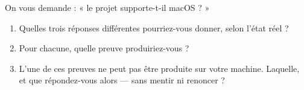 \begin{nklogique}
On vous demande : « le projet supporte-t-il macOS ? »

\begin{enumerate}
\item Quelles trois réponses différentes pourriez-vous donner, selon l'état réel ?
\item Pour chacune, quelle preuve produiriez-vous ?
\item L'une de ces preuves ne peut pas être produite sur votre machine.
      Laquelle, et que répondez-vous alors --- sans mentir ni renoncer ?
\end{enumerate}
\end{nklogique}
